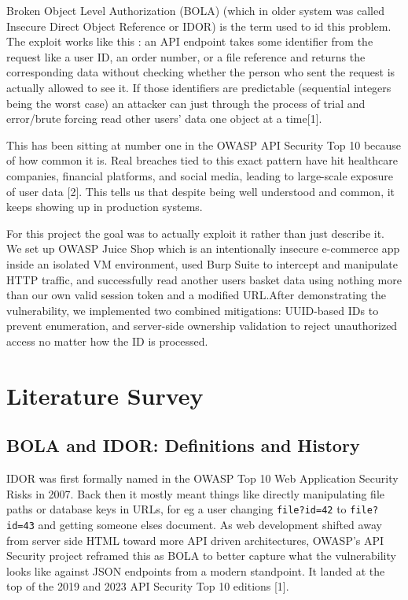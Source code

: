 \documentclass[12pt]{IEEEtran}
\begin{document}
Broken Object Level Authorization (BOLA) (which in older system was called Insecure Direct Object Reference or IDOR) is the term used to id this problem. The exploit works like this : an API endpoint takes some identifier from the request like a user ID, an order number, or a file reference and returns the corresponding data without checking whether the person who sent the request is actually allowed to see it. If those identifiers are predictable (sequential integers being the worst case) an attacker can just through the process of trial and error/brute forcing read other users' data one object at a time[1].

This has been sitting at number one in the OWASP API Security Top 10 because of how common it is. Real breaches tied to this exact pattern have hit healthcare companies, financial platforms, and social media, leading to large-scale exposure of user data [2]. This tells us that despite being well understood and common, it keeps showing up in production systems.

For this project the goal was to actually exploit it rather than just describe it. We set up OWASP Juice Shop which is an intentionally insecure e-commerce app inside an isolated VM environment, used Burp Suite to intercept and manipulate HTTP traffic, and successfully read another users basket data using nothing more than our own valid session token and a modified URL.After demonstrating the vulnerability, we implemented two combined mitigations: UUID-based IDs to prevent enumeration, and server-side ownership validation to reject unauthorized access no matter how the ID is processed.

\section{Literature Survey}

\subsection{BOLA and IDOR: Definitions and History}

IDOR was first formally named in the OWASP Top 10 Web Application Security Risks in 2007. Back then it mostly meant things like directly manipulating file paths or database keys in URLs, for eg a user changing \texttt{file?id=42} to \texttt{file?id=43} and getting someone elses document. As web development shifted away from server side HTML toward more API driven architectures, OWASP's API Security project reframed this as BOLA to better capture what the vulnerability looks like against JSON endpoints from a modern standpoint. It landed at the top of the 2019 and 2023 API Security Top 10 editions [1].
\end{document}
